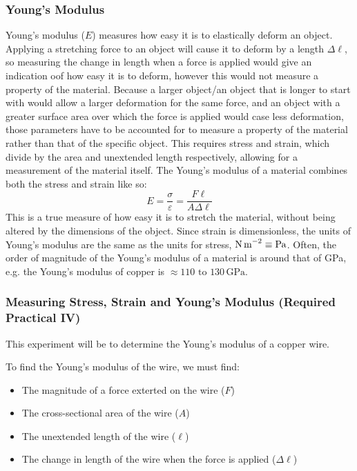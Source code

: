         \subsubsection{Young's Modulus}
            Young's modulus ($E$) measures how easy it is to elastically deform an object.
            Applying a stretching force to an object will cause it to deform by a length $\Delta\ell$, so measuring the change in length when a force is applied would give an indication oof how easy it is to deform, however this would not measure a property of the material.
            Because a larger object/an object that is longer to start with would allow a larger deformation for the same force, and an object with a greater surface area over which the force is applied would case less deformation, those parameters have to be accounted for to measure a property of the material rather than that of the specific object.
            This requires stress and strain, which divide by the area and unextended length respectively, allowing for a measurement of the material itself.
            The Young's modulus of a material combines both the stress and strain like so:
            \begin{equation}
                E=\frac{\sigma}{\varepsilon}=\frac{F\ell}{A\Delta\ell}
            \end{equation}
            This is a true measure of how easy it is to stretch the material, without being altered by the dimensions of the object.
            Since strain is dimensionless, the units of Young's modulus are the same as the units for stress, $\text{N\,m}^{-2}\equiv\text{Pa}$.
            Often, the order of magnitude of the Young's modulus of a material is around that of GPa, e.g. the Young's modulus of copper is $\approx110\text{ to }130\,\text{GPa}$.

        \subsubsection{Measuring Stress, Strain and Young's Modulus (Required Practical IV)}
            This experiment will be to determine the Young's modulus of a copper wire.

            To find the Young's modulus of the wire, we must find:
            \begin{itemize}
                \item The magnitude of a force exterted on the wire ($F$)
                \item The cross-sectional area of the wire ($A$)
                \item The unextended length of the wire ($\ell$)
                \item The change in length of the wire when the force is applied ($\Delta\ell$)
            \end{itemize}
            
